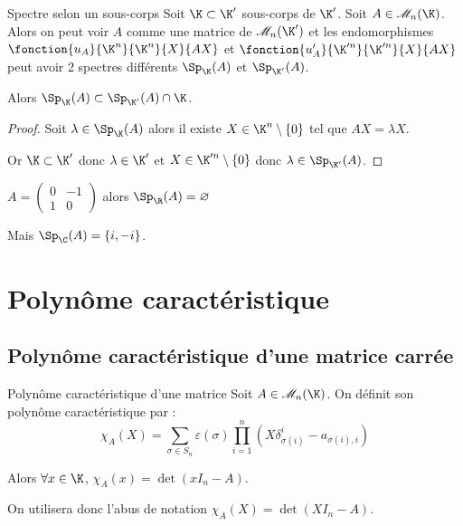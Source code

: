 \begin{proposition}{Spectre selon un sous-corps}{}
    Soit $\K \subset \K'$ sous-corps de $\K'$. 
    Soit $A \in \mathscr M_n(\K)$. Alors on peut voir $A$ comme une matrice de 
    $\mathscr M_n(\K')$ et les endomorphismes 
    $\fonction{u_A}{\K^n}{\K^n}{X}{AX}$ et
    $\fonction{u'_A}{\K'^n}{\K'^n}{X}{AX}$ peut avoir 2 spectres différents 
    $\Sp_\K (A)$ et $\Sp_{\K'}(A)$.

    Alors $\Sp_\K (A) \subset \Sp_{\K'}(A) \cap \K$.
\end{proposition}

\begin{proof}
    Soit $\lambda \in \Sp_\K (A)$ alors il existe $X \in \K^n \setminus \{0\}$ tel que
    $AX = \lambda X$.

    Or $\K \subset \K'$ donc $\lambda \in \K'$ et $X \in \K'^n \setminus \{0\}$ donc
    $\lambda \in \Sp_{\K'}(A)$.
\end{proof}

\begin{exemple}
    $A = \begin{pmatrix}
        0 & -1 \\
        1 & 0
    \end{pmatrix}$ alors $\Sp_\R(A) = \varnothing$ 

    Mais $\Sp_\C(A) = \{i, -i\}$.
\end{exemple}


\section{Polynôme caractéristique }
\subsection{Polynôme caractéristique d'une matrice carrée}

\begin{definition}{Polynôme caractéristique d'une matrice}{}
    Soit $A \in \mathscr M_n (\K)$. On définit son polynôme caractéristique par : 
    \[
        \chi_A(X) = \sum_{\sigma \in S_n} \varepsilon(\sigma) \prod_{i = 1 }^{ n } (X \delta_{\sigma(i)}^i - a_{\sigma(i), i})
    \]

    Alors $\forall x \in \K$, $\chi_A(x) = \det (x I_n - A)$.

    On utilisera donc l'abus de notation $\chi_A(X) = \det (X I_n - A)$.
\end{definition}

